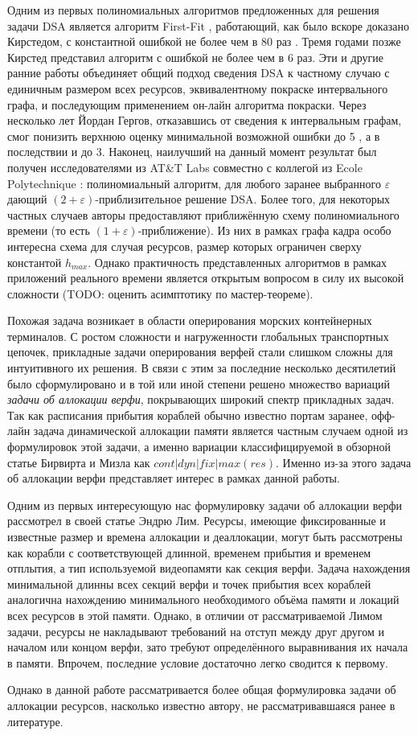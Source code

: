 Одним из первых полиномиальных алгоритмов предложенных для решения задачи DSA является алгоритм First-Fit \cite{chrobak_packing_1988}, работающий, как было вскоре доказано Кирстедом, с константной ошибкой не более чем в 80 раз \cite{kierstead_linearity_1988}.
Тремя годами позже Кирстед представил алгоритм с ошибкой не более чем в 6 раз\cite{kierstead_polynomial_1991}.
Эти и другие ранние работы объединяет общий подход сведения DSA к частному случаю с единичным размером всех ресурсов, эквивалентному покраске интервального графа, и последующим применением он-лайн алгоритма покраски.
Через несколько лет Йордан Гергов, отказавшись от сведения к интервальным графам, смог понизить верхнюю оценку минимальной возможной ошибки до 5 \cite{gergov_approximation_1996}, а в последствии и до 3\cite{gergov_algorithms_1999}.
Наконец, наилучший на данный момент результат был получен исследователями из AT\&T Labs совместно с коллегой из Ecole Polytechnique \cite{buchsbaum_opt_2003}: полиномиальный алгоритм, для любого заранее выбранного $\varepsilon$ дающий $(2+\varepsilon)$-приблизительное решение DSA.
Более того, для некоторых частных случаев авторы предоставляют приближённую схему полиномиального времени (то есть $(1+\varepsilon)$-приближение).
Из них в рамках графа кадра особо интересна схема для случая ресурсов, размер которых ограничен сверху константой $h_{max}$.
Однако практичность представленных алгоритмов в рамках приложений реального времени является открытым вопросом в силу их высокой сложности (TODO: оценить асимптотику по мастер-теореме).

Похожая задача возникает в области оперирования морских контейнерных терминалов.
С ростом сложности и нагруженности глобальных транспортных цепочек, прикладные задачи оперирования верфей стали слишком сложны для интуитивного их решения.
В связи с этим за последние несколько десятилетий было сформулировано и в той или иной степени решено множество вариаций \textit{задачи об аллокации верфи}, покрывающих широкий спектр прикладных задач.
Так как расписания прибытия кораблей обычно известно портам заранее, офф-лайн задача динамической аллокации памяти является частным случаем одной из формулировок этой задачи, а именно вариации классифицируемой в обзорной статье Бирвирта и Мизла\cite{BIERWIRTH2010615} как $cont|dyn|fix|max(res)$.
Именно из-за этого задача об аллокации верфи представляет интерес в рамках данной работы.

Одним из первых интересующую нас формулировку задачи об аллокации верфи рассмотрел в своей статье Эндрю Лим\cite{LIM1998105}.
Ресурсы, имеющие фиксированные и известные размер и времена аллокации и деаллокации, могут быть рассмотрены как корабли с соответствующей длинной, временем прибытия и временем отплытия, а тип используемой видеопамяти как секция верфи.
Задача нахождения минимальной длинны всех секций верфи и точек прибытия всех кораблей аналогична нахождению минимального необходимого объёма памяти и локаций всех ресурсов в этой памяти.
Однако, в отличии от рассматриваемой Лимом задачи, ресурсы не накладывают требований на отступ между друг другом и началом или концом верфи, зато требуют определённого выравнивания их начала в памяти.
Впрочем, последние условие достаточно легко сводится к первому.

Однако в данной работе рассматривается более общая формулировка задачи об аллокации ресурсов, насколько известно автору, не рассматривавшаяся ранее в литературе.

